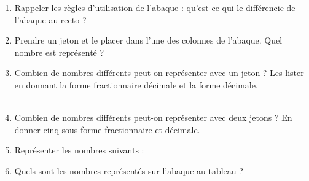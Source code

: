          \begin{enumerate}
            \item Rappeler les règles d'utilisation de l'abaque : qu'est-ce qui le différencie de l'abaque au recto ?
            \item Prendre un jeton et le placer dans l'une des colonnes de l'abaque. Quel nombre est représenté ? \\ [1mm]
               \pf \medskip
            \item Combien de nombres différents peut-on représenter avec un jeton ? Les lister en donnant la forme fractionnaire décimale et la forme décimale. \\ [2mm]
               \pf \\ [4mm]
               \pf \bigskip
            \item Combien de nombres différents peut-on représenter avec deux jetons ? En donner cinq sous forme fractionnaire et décimale. \\ [2mm]
               \pf \bigskip
            \item Représenter les nombres suivants :
            \item Quels sont les nombres représentés sur l'abaque au tableau ? \\ [2mm]
               \pf
         \end{enumerate}

